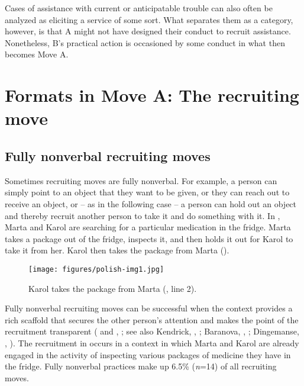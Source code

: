 \documentclass[output=paper]{langsci/langscibook}
\begin{document}
Cases of assistance with current or anticipatable trouble can also often be analyzed as eliciting a service of some sort.  What separates them as a category, however, is that A might not have designed their conduct to recruit assistance. Nonetheless, B’s practical action is occasioned by some conduct in what then becomes Move A.

\section{Formats in Move A: The recruiting move}

\subsection{Fully nonverbal recruiting moves}\label{sec:zinken:3.1}

Sometimes recruiting moves are fully nonverbal.  For example, a person can simply point to an object that they want to be given, or they can reach out to receive an object, or -- as in the following case -- a person can hold out an object and thereby recruit another person to take it and do something with it.  In , Marta and Karol are searching for a particular medication in the fridge.  Marta takes a package out of the fridge, inspects it, and then holds it out for Karol to take it from her.  Karol then takes the package from Marta ().

%
\begin{mdframednoverticalspace}[style=firstfoc]
\end{mdframednoverticalspace}
%
\begin{mdframednoverticalspace}[style=secondfoc]
\end{mdframednoverticalspace}
%
\begin{figure}
\caption{Karol takes the package from Marta (, line 2).}
\texttt{[image: figures/polish-img1.jpg]}
\label{fig:zinken:1}
\end{figure}

Fully nonverbal recruiting moves can be successful when the context provides a rich scaffold that secures the other person’s attention and makes the point of the recruitment transparent (\citealt{Rossi2014} and , ; see also Kendrick, , ; Baranova, , ; Dingemanse, , ). The recruitment in  occurs in a context in which Marta and Karol are already engaged in the activity of inspecting various packages of medicine they have in the fridge. Fully nonverbal practices make up 6.5\% (\textit{n}=14) of all recruiting moves.
\end{document}

